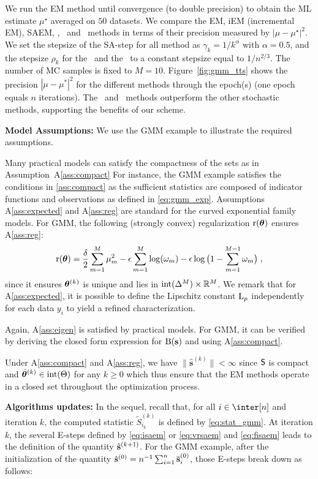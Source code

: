 \documentclass[journal, 11pt]{IEEEtran}
\begin{document}
We run the EM method until convergence (to double precision) to obtain the ML estimate $\mu^\star$ averaged on $50$ datasets. 
We compare the EM, iEM (incremental EM), SAEM, \ISAEM, \SAEMVR\ and \FISAEM\ methods in terms of their precision measured by $| \mu - \mu^\star |^2$. 
We set the stepsize of the \textsf{SA-step} for all method as $\gamma_k = 1/k^{\alpha}$ with $\alpha = 0.5$, and the stepsize $\rho_k$ for the \SAEMVR\ and the \FISAEM\ to a constant stepsize equal to $1/n^{2/3}$. 
The number of MC samples is fixed to $M=10$.
Figure~\ref{fig:gmm_tts} shows the precision $|\mu - \mu^*|^2$ for the different methods through the epoch(s) (one epoch equals $n$ iterations). 
The \SAEMVR\ and \FISAEM\ methods outperform the other stochastic methods, supporting the benefits of our scheme.

\vspace{0.08in}
\noindent \textbf{Model Assumptions:}
We use the GMM example to illustrate the required assumptions.

Many practical models can satisfy the compactness of the sets as in Assumption~A\ref{ass:compact}
For instance, the GMM example satisfies the conditions in \ref{ass:compact} as the sufficient statistics are composed of indicator functions and observations as defined in \eqref{eq:gmm_exp}.
Assumptions A\ref{ass:expected} and A\ref{ass:reg} are standard for the curved exponential family models.
For GMM, the following (strongly convex) regularization $\operatorname{r}( {\bm{\theta}} )$ ensures A\ref{ass:reg}:
$$
\operatorname{r}( {\bm{\theta}} ) = \frac{\delta}{2} \sum_{m=1}^M \mu_m^2 - \epsilon \sum_{m=1}^M  \log ( \omega_m )  - \epsilon \log \big( 1 - \sum_{m=1}^{M-1} \omega_m \big) \;,
$$
since it ensures ${\bm{\theta}}^{(k)}$ is unique and lies in ${\rm int}( \Delta^M ) \times \mathbb{R}^M$.
We remark that for A\ref{ass:expected}, it is possible to define the Lipschitz constant $\operatorname{L}_{p}$ independently for each data $y_i$ to yield a refined characterization. 

Again, A\ref{ass:eigen} is satisfied by practical models. For GMM, it can be verified by deriving the closed form expression for $\operatorname{B}( {\mathbf{s}} )$ and using A\ref{ass:compact}.

Under A\ref{ass:compact} and A\ref{ass:reg}, we have $\| \hat{\bm s}^{(k)} \| < \infty$ since $\mathsf{S}$ is compact and $\hat{{\bm{\theta}}}^{(k)} \in {\rm int}( \Theta )$ for any $k \geq 0$ which thus ensure that the EM methods operate in a closed set throughout the optimization process.


\vspace{0.08in}
\noindent \textbf{Algorithms updates:}
In the sequel, recall that, for all $i \in \inter[n]$ and iteration $k$, the computed statistic $ \tilde{S}_{i_k}^{(k)}$ is defined by \eqref{eq:stat_gmm}.
At iteration $k$, the several E-steps defined by \eqref{eq:isaem} or \eqref{eq:vrsaem} and \eqref{eq:fisaem} leads to the definition of the quantity $\hat{{\mathbf{s}}}^{(k+1)} $. For the GMM example, after the initialization of the quantity $\hat{{\mathbf{s}}}^{(0)} = n^{-1} \sum\nolimits_{i=1}^n \overline{{\mathbf{s}}}_i^{(0)} $, those E-steps break down as follows:
\end{document}
